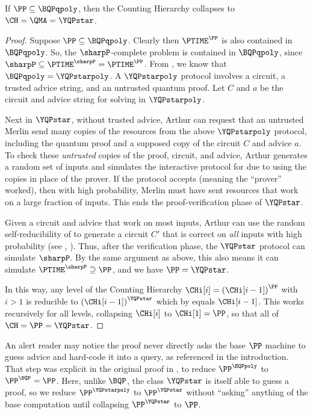 \documentclass{toc}
\begin{document}
\begin{theorem}\label{thm:main}
	If $\PP \subseteq \BQPqpoly$, then the Counting Hierarchy collapses to
	$\CH = \QMA = \YQPstar$.
\end{theorem}

\begin{proof}
	Suppose $\PP \subseteq \BQPqpoly$.
	Clearly then $\PTIME^\PP$ is also contained in $\BQPqpoly$.
	So, the $\sharpP$-complete problem \perm{} is contained in $\BQPqpoly$, since $\sharpP\subseteq \PTIME^\sharpP=\PTIME^\PP$.
	From \cite{aaronson2014full}, we know that
	$\BQPqpoly=\YQPstarpoly$.
	A $\YQPstarpoly$ protocol involves a circuit, a trusted advice string, and an untrusted quantum proof.
	Let $C$ and $a$ be the circuit and advice string for solving \perm{} in $\YQPstarpoly$.
	
	Next in $\YQPstar$, without trusted advice, 
	Arthur can request that an untrusted Merlin
	send many copies of the resources from the above $\YQPstarpoly$ protocol,
	including the quantum proof
	and a supposed copy of the circuit $C$ and advice $a$.
	To check these \emph{untrusted} copies of the proof, circuit, and advice,
	Arthur generates a random set of inputs and
	simulates the interactive protocol for \perm{} due to \cite{lund1992algebraic}
	using the copies in place of the prover.
	If the protocol accepts (meaning the ``prover'' worked),
	then with high probability, Merlin must have sent resources that work on a large fraction of inputs.
	This ends the proof-verification phase of $\YQPstar$.
	
	Given a circuit and advice that work on most inputs,
	Arthur can use the random self-reducibility of
	 to generate a circuit $C'$ that is correct on \emph{all} inputs with high probability
	(see \eg{}, \cite[Sec. 8.6.2]{arora2009computational}).
	Thus, after the verification phase, the $\YQPstar$ protocol can simulate $\sharpP$.
	By the same argument as above, this also means it can simulate $\PTIME^\sharpP \supseteq \PP$, 
	and we have $\PP = \YQPstar$.
	
	In this way, any level of the Counting Hierarchy
	$\CHi[i] = \left(\CHi[i-1]\right)^\PP$ with $i>1$ is reducible to
	$\left(\CHi[i-1]\right)^{\YQPstar}$
	which by  equals $\CHi[i-1]$.
	This works recursively for all levels, collapsing $\CHi[i]$ to $\CHi[1]=\PP$,
	so that all of $\CH=\PP=\YQPstar$.
\end{proof}

An alert reader may notice the proof never directly asks the base $\PP$ machine to
guess advice and hard-code it into a query, as referenced in the introduction.
That step was explicit in the original proof %
in \cite{aaronson_subtle}, %
to reduce $\PP^\BQPpoly$ to $\PP^\BQP=\PP$.
Here, unlike $\BQP$, the class $\YQPstar$ is itself able to guess a proof,
so we reduce $\PP^\YQPstarpoly$ to $\PP^\YQPstar$ without ``asking'' anything of the
base computation until collapsing $\PP^\YQPstar$ to $\PP$.
\end{document}
